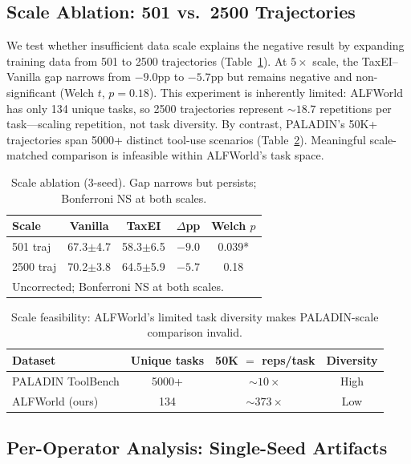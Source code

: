 \documentclass[11pt,a4paper]{article}
\begin{document}
\subsection{Scale Ablation: 501 vs.\ 2500 Trajectories}
\label{sec:scale}

We test whether insufficient data scale explains the negative result by expanding training data from 501 to 2500 trajectories (Table~\ref{tab:scale}).
At $5\times$ scale, the TaxEI--Vanilla gap narrows from $-9.0$pp to $-5.7$pp but remains negative and non-significant (Welch $t$, $p{=}0.18$).
This experiment is inherently limited: ALFWorld has only 134 unique tasks, so 2500 trajectories represent ${\sim}18.7$ repetitions per task---scaling repetition, not task diversity.
By contrast, PALADIN's 50K+ trajectories span 5000+ distinct tool-use scenarios (Table~\ref{tab:scale_feasibility}).
Meaningful scale-matched comparison is infeasible within ALFWorld's task space.

\begin{table}[t]
\centering
\small
\caption{Scale ablation (3-seed). Gap narrows but persists; Bonferroni NS at both scales.}
\label{tab:scale}
\begin{tabular}{lcccc}
\toprule
\textbf{Scale} & \textbf{Vanilla} & \textbf{TaxEI} & \textbf{$\Delta$pp} & \textbf{Welch $p$} \\
\midrule
501 traj & 67.3$\pm$4.7 & 58.3$\pm$6.5 & $-9.0$ & 0.039* \\
2500 traj & 70.2$\pm$3.8 & 64.5$\pm$5.9 & $-5.7$ & 0.18 \\
\bottomrule
\multicolumn{5}{l}{\footnotesize * Uncorrected; Bonferroni NS at both scales.}
\end{tabular}
\end{table}

\begin{table}[t]
\centering
\small
\caption{Scale feasibility: ALFWorld's limited task diversity makes PALADIN-scale comparison invalid.}
\label{tab:scale_feasibility}
\begin{tabular}{lccc}
\toprule
\textbf{Dataset} & \textbf{Unique tasks} & \textbf{50K $=$ reps/task} & \textbf{Diversity} \\
\midrule
PALADIN ToolBench & 5000+ & ${\sim}10\times$ & High \\
ALFWorld (ours) & 134 & ${\sim}373\times$ & Low \\
\bottomrule
\end{tabular}
\end{table}

\subsection{Per-Operator Analysis: Single-Seed Artifacts}
\label{sec:peroperator}
\end{document}
